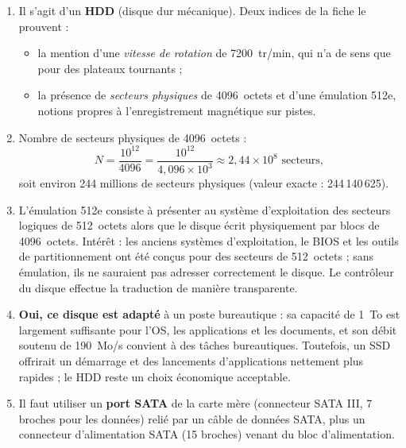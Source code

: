 \documentclass[11pt]{article}
\newcommand{\cle}[1]{{\popxbold\color{popdark}#1}}
\begin{document}
\begin{corrige}
\begin{enumerate}
    \item Il s'agit d'un \textbf{HDD} (disque dur mécanique). Deux indices de la fiche le prouvent :
    \begin{itemize}
        \item la mention d'une \emph{vitesse de rotation} de \SI{7200}{tr/min}, qui n'a de sens que pour des plateaux tournants ;
        \item la présence de \emph{secteurs physiques} de \SI{4096}{octets} et d'une émulation 512e, notions propres à l'enregistrement magnétique sur pistes.
    \end{itemize}
    \item Nombre de secteurs physiques de \SI{4096}{octets} :
    \[ N = \frac{10^{12}}{4096} = \frac{10^{12}}{4,096 \times 10^{3}} \approx 2,44 \times 10^{8} \text{ secteurs}, \]
    soit environ 244 millions de secteurs physiques (valeur exacte : 244\,140\,625).
    \item L'émulation \cle{512e} consiste à présenter au système d'exploitation des secteurs logiques de \SI{512}{octets} alors que le disque écrit physiquement par blocs de \SI{4096}{octets}. Intérêt : les anciens systèmes d'exploitation, le BIOS et les outils de partitionnement ont été conçus pour des secteurs de \SI{512}{octets} ; sans émulation, ils ne sauraient pas adresser correctement le disque. Le contrôleur du disque effectue la traduction de manière transparente.
    \item \textbf{Oui, ce disque est adapté} à un poste bureautique : sa capacité de \SI{1}{To} est largement suffisante pour l'OS, les applications et les documents, et son débit soutenu de \SI{190}{Mo/s} convient à des tâches bureautiques. Toutefois, un SSD offrirait un démarrage et des lancements d'applications nettement plus rapides ; le HDD reste un choix économique acceptable.
    \item Il faut utiliser un \textbf{port SATA} de la carte mère (connecteur SATA III, 7 broches pour les données) relié par un câble de données SATA, plus un connecteur d'alimentation SATA (15 broches) venant du bloc d'alimentation.
\end{enumerate}
\end{corrige}
\end{document}
